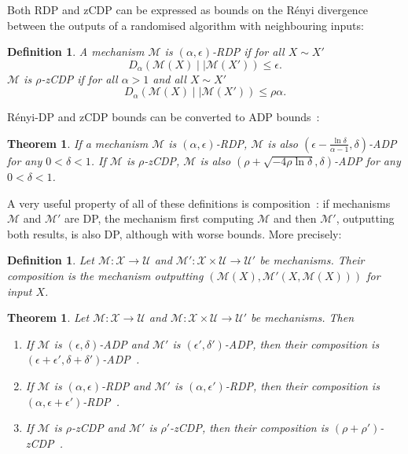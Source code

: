 \documentclass[english,twoside,openright]{HYgraduMLDS}
\newtheorem{theorem}[lemma]{Theorem}
\newtheorem{definition}[lemma]{Definition}
\newcommand{\dmid}{\mid\mid}
\newcommand{\calm}{{\mathcal{M}}}
\newcommand{\calx}{{\mathcal{X}}}
\newcommand{\calu}{{\mathcal{U}}}
\begin{document}
Both RDP and zCDP can be expressed as bounds on the
Rényi divergence between the outputs of a randomised algorithm with
neighbouring inputs:

\begin{definition}
    A mechanism \(\calm\) is \((\alpha, \epsilon)\)-RDP
    if for all \(X \sim X'\)
    \[
        D_\alpha(\calm(X)\dmid \calm(X')) \leq \epsilon.
    \]
    \(\calm\) is \(\rho\)-zCDP if for all \(\alpha > 1\)
    and all \(X \sim X'\)
    \[
        D_\alpha(\calm(X)\dmid \calm(X')) \leq \rho \alpha.
    \]

\end{definition}

Rényi-DP and zCDP bounds can be converted to ADP bounds~\cite{Mironov17, BuS16}:
\begin{theorem}\label{other_dp_to_adp}
    If a mechanism \(\calm\) is \((\alpha, \epsilon)\)-RDP, \(\calm\) is also
    \((\epsilon - \frac{\ln \delta}{\alpha - 1}, \delta)\)-ADP for any 
    \(0 < \delta < 1\). If \(\calm\) is \(\rho\)-zCDP, \(\calm\) is also 
    \((\rho + \sqrt{-4\rho\ln \delta}, \delta)\)-ADP for any \(0 < \delta < 1\).
\end{theorem}

A very useful property of all of these definitions is composition~\cite{DwR14}: 
if mechanisms \(\calm\) and \(\calm'\) are DP, the mechanism first computing
\(\calm\) and then \(\calm'\), outputting both results, 
is also DP, although with worse bounds.
More precisely:

\begin{definition}\label{composition_definition}
    Let \(\calm\colon \calx \to \calu\) and 
    \(\calm'\colon \calx\times \calu \to \calu'\) be mechanisms.
    Their composition is the mechanism outputting
    \((\calm(X), \calm'(X, \calm(X)))\) for input \(X\).
\end{definition}

\begin{theorem}\label{composition-theorem}
    Let \(\calm\colon \calx \to \calu\) and 
    \(\calm\colon \calx\times \calu \to \calu'\) be mechanisms. Then
    \begin{enumerate}
        \item 
            If \(\calm\) is \((\epsilon, \delta)\)-ADP and 
            \(\calm'\) is \((\epsilon', \delta')\)-ADP, then 
            their composition is 
            \((\epsilon + \epsilon', \delta + \delta')\)-ADP~\cite{DKM06}.
        \item 
            If \(\calm\) is \((\alpha, \epsilon)\)-RDP and 
            \(\calm'\) is \((\alpha, \epsilon')\)-RDP, then 
            their composition is \((\alpha, \epsilon + \epsilon')\)-RDP~\cite{Mironov17}.
        \item 
            If \(\calm\) is \(\rho\)-zCDP and 
            \(\calm'\) is \(\rho'\)-zCDP, then 
            their composition is \((\rho + \rho')\)-zCDP~\cite{BuS16}.
    \end{enumerate}
\end{theorem}
\end{document}
